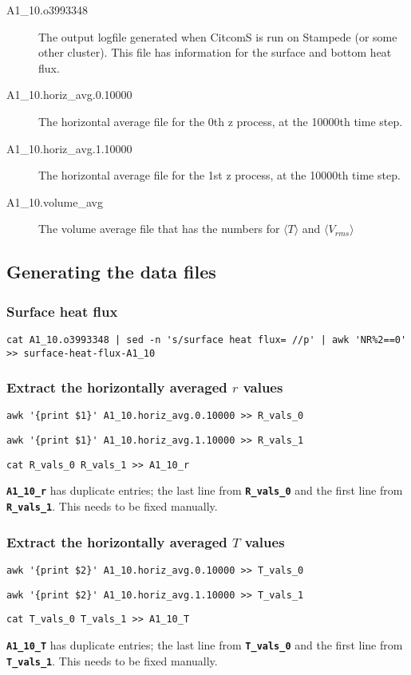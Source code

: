 \documentclass[10pt]{article}
\begin{document}
\begin{description}
\item[A1\_10.o3993348] The output logfile generated when CitcomS is run on Stampede (or some other cluster). This file
has information for the surface and bottom heat flux.
\item[A1\_10.horiz\_avg.0.10000] The horizontal average file for the 0th z process, at the 10000th time step. 
\item[A1\_10.horiz\_avg.1.10000] The horizontal average file for the 1st z process, at the 10000th time step.
\item[A1\_10.volume\_avg] The volume average file that has the numbers for $\langle T\rangle$ and 
$\langle V_{rms}\rangle$
\end{description}

\subsection*{Generating the data files}
\subsubsection*{Surface heat flux}
\begin{verbatim}
cat A1_10.o3993348 | sed -n 's/surface heat flux= //p' | awk 'NR%2==0' >> surface-heat-flux-A1_10
\end{verbatim}
\subsubsection*{Extract the horizontally averaged $r$ values}
\begin{verbatim}
awk '{print $1}' A1_10.horiz_avg.0.10000 >> R_vals_0
\end{verbatim}
\begin{verbatim}
awk '{print $1}' A1_10.horiz_avg.1.10000 >> R_vals_1
\end{verbatim}
\begin{verbatim}
cat R_vals_0 R_vals_1 >> A1_10_r
\end{verbatim}
\textbf{\texttt{A1\_10\_r}} has duplicate entries; the last line from \textbf{\texttt{R\_vals\_0}} and the first line
from \textbf{\texttt{R\_vals\_1}}. This needs to be fixed manually.
\subsubsection*{Extract the horizontally averaged $T$ values}
\begin{verbatim}
awk '{print $2}' A1_10.horiz_avg.0.10000 >> T_vals_0
\end{verbatim}
\begin{verbatim}
awk '{print $2}' A1_10.horiz_avg.1.10000 >> T_vals_1
\end{verbatim}
\begin{verbatim}
cat T_vals_0 T_vals_1 >> A1_10_T
\end{verbatim}
\textbf{\texttt{A1\_10\_T}} has duplicate entries; the last line from \textbf{\texttt{T\_vals\_0}} and the first line
from \textbf{\texttt{T\_vals\_1}}. This needs to be fixed manually.
\end{document}
